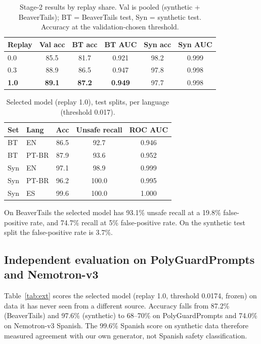 \documentclass[conference]{IEEEtran}
\begin{document}
\begin{table}[t]
\caption{Stage-2 results by replay share. Val is pooled (synthetic + BeaverTails); BT = BeaverTails test, Syn = synthetic test. Accuracy at the validation-chosen threshold.}\label{tab:main}
\centering\small
\begin{tabular}{lccccc}
\toprule
Replay & Val acc & BT acc & BT AUC & Syn acc & Syn AUC\\
\midrule
0.0 & 85.5 & 81.7 & 0.921 & 98.2 & 0.999\\
0.3 & 88.9 & 86.5 & 0.947 & 97.8 & 0.998\\
\textbf{1.0} & \textbf{89.1} & \textbf{87.2} & \textbf{0.949} & 97.7 & 0.998\\
\bottomrule
\end{tabular}
\end{table}

\begin{table}[t]
\caption{Selected model (replay 1.0), test splits, per language (threshold 0.017).}\label{tab:lang}
\centering\small
\begin{tabular}{llccc}
\toprule
Set & Lang & Acc & Unsafe recall & ROC AUC\\
\midrule
BT & EN & 86.5 & 92.7 & 0.946\\
BT & PT-BR & 87.9 & 93.6 & 0.952\\
Syn & EN & 97.1 & 98.9 & 0.999\\
Syn & PT-BR & 96.2 & 100.0 & 0.995\\
Syn & ES & 99.6 & 100.0 & 1.000\\
\bottomrule
\end{tabular}
\end{table}

On BeaverTails the selected model has 93.1\% unsafe recall at a 19.8\% false-positive rate, and 74.7\% recall at 5\% false-positive rate. On the synthetic test split the false-positive rate is 3.7\%.

\subsection{Independent evaluation on PolyGuardPrompts and Nemotron-v3}\label{sec:ext}
Table~\ref{tab:ext} scores the selected model (replay 1.0, threshold 0.0174, frozen) on data it has never seen from a different source. Accuracy falls from 87.2\% (BeaverTails) and 97.6\% (synthetic) to 68--70\% on PolyGuardPrompts and 74.0\% on Nemotron-v3 Spanish. The 99.6\% Spanish score on synthetic data therefore measured agreement with our own generator, not Spanish safety classification.
\end{document}
